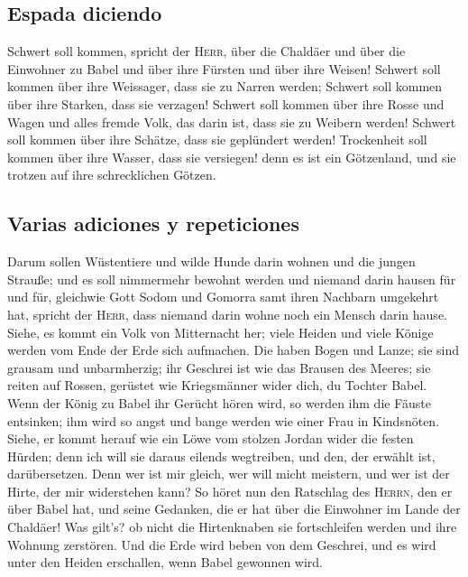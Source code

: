 \hypertarget{espada-diciendo}{%
\subsection{Espada diciendo}\label{espada-diciendo}}

 Schwert soll kommen, spricht der \textsc{Herr}, über die
Chaldäer und über die Einwohner zu Babel und über ihre Fürsten und über
ihre Weisen!  Schwert soll kommen über ihre Weissager,
dass sie zu Narren werden; Schwert soll kommen über ihre Starken, dass
sie verzagen!  Schwert soll kommen über ihre Rosse und
Wagen und alles fremde Volk, das darin ist, dass sie zu Weibern werden!
Schwert soll kommen über ihre Schätze, dass sie geplündert werden!
 Trockenheit soll kommen über ihre Wasser, dass sie
versiegen! denn es ist ein Götzenland, und sie trotzen auf ihre
schrecklichen Götzen.

\hypertarget{varias-adiciones-y-repeticiones}{%
\subsection{Varias adiciones y
repeticiones}\label{varias-adiciones-y-repeticiones}}

 Darum sollen Wüstentiere und wilde Hunde darin wohnen
und die jungen Strauße; und es soll nimmermehr bewohnt werden und
niemand darin hausen für und für,  gleichwie Gott Sodom
und Gomorra samt ihren Nachbarn umgekehrt hat, spricht der
\textsc{Herr}, dass niemand darin wohne noch ein Mensch darin hause.
 Siehe, es kommt ein Volk von Mitternacht her; viele
Heiden und viele Könige werden vom Ende der Erde sich aufmachen.
 Die haben Bogen und Lanze; sie sind grausam und
unbarmherzig; ihr Geschrei ist wie das Brausen des Meeres; sie reiten
auf Rossen, gerüstet wie Kriegsmänner wider dich, du Tochter Babel.
 Wenn der König zu Babel ihr Gerücht hören wird, so
werden ihm die Fäuste entsinken; ihm wird so angst und bange werden wie
einer Frau in Kindsnöten.  Siehe, er kommt herauf wie ein
Löwe vom stolzen Jordan wider die festen Hürden; denn ich will sie
daraus eilends wegtreiben, und den, der erwählt ist, darübersetzen. Denn
wer ist mir gleich, wer will micht meistern, und wer ist der Hirte, der
mir widerstehen kann?  So höret nun den Ratschlag des
\textsc{Herrn}, den er über Babel hat, und seine Gedanken, die er hat
über die Einwohner im Lande der Chaldäer! Was gilt's? ob nicht die
Hirtenknaben sie fortschleifen werden und ihre Wohnung zerstören.
 Und die Erde wird beben von dem Geschrei, und es wird
unter den Heiden erschallen, wenn Babel gewonnen wird.

